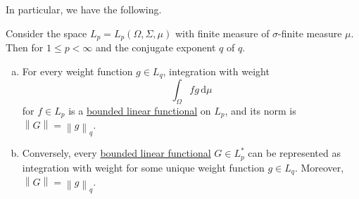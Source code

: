 In particular, we have the following.
\begin{theorem}[\(L_{p} ^{\ast} = L_q\)]\label{thm:lec6}
	Consider the space \(L_p = L_p(\Omega , \Sigma , \mu )\) with finite measure of \(\sigma \)-finite measure \(\mu \). Then for \(1 \leq p < \infty \) and the conjugate exponent \(q \) of \(q\).
	\begin{enumerate}[(a)]
		\item For every weight function \(g\in L_q\), integration with weight
		      \[
			      \int _\Omega fg\,\mathrm{d} \mu
		      \]
		      for \(f\in L_p\) is a \hyperref[def:bounded-linear-functional]{bounded linear functional} on \(L_p\), and its norm is \(\left\lVert G\right\rVert = \left\lVert g\right\rVert _q\).
		\item Conversely, every \hyperref[def:bounded-linear-functional]{bounded linear functional} \(G\in L^{\ast} _p\) can be represented as integration with weight for some unique weight function \(g\in L_q\). Moreover, \(\left\lVert G\right\rVert = \left\lVert g\right\rVert _q\).
	\end{enumerate}
\end{theorem}